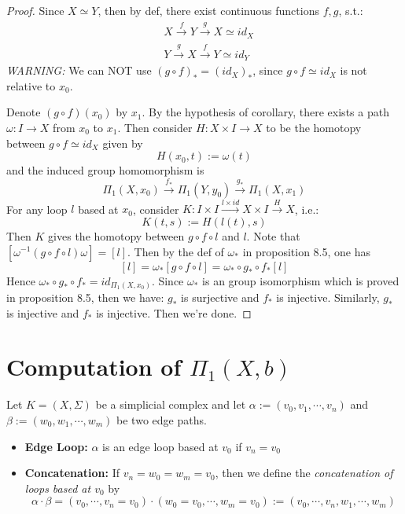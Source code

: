 \begin{proof}
    Since $X \simeq Y$, then by def, there exist continuous functions $f,g$, s.t.:
    \begin{align*}
        &X \overset{f}{\rightarrow} Y \overset{g}{\rightarrow} X \simeq id_X\\
        &Y \overset{g}{\rightarrow} X \overset{f}{\rightarrow} Y \simeq id_Y
    \end{align*}
    \noindent\textit{WARNING:} We can NOT use $(g \circ f)_* = (id_X)_*$, since $g \circ f \simeq id_X$ is not relative to $x_0$.

    Denote $(g \circ f)(x_0)$ by $x_1$. By the hypothesis of corollary, there exists a path $\omega: I \rightarrow X$ from $x_0$ to $x_1$. Then consider $H: X \times I \rightarrow X$ to be the homotopy between $g \circ f \simeq id_X$ given by
    $$H(x_0 ,t) := \omega(t)$$
    and the induced group homomorphism is 
    $$\Pi_1 (X,x_0) \overset{f_*}{\rightarrow} \Pi_1 (Y, y_0) \overset{g_*}{\rightarrow} \Pi_1 (X,x_1)$$
    For any loop $l$ based at $x_0$, consider $K: I\times I \overset{l \times id}{\rightarrow} X \times I \overset{H}{\rightarrow} X$, i.e.:
    $$K (t,s) := H(l(t),s)$$
    Then $K$ gives the homotopy between $g \circ f \circ l$ and $l$. Note that $[\omega^{-1} (g \circ f \circ l)\omega] = [l]$. Then by the def of $\omega_*$ in proposition 8.5, one has
    $$[l] = \omega_* [g \circ f \circ l] = \omega_* \circ g_* \circ f_* [l]$$
    Hence $\omega_* \circ g_* \circ f_* = id_{\Pi_1(X,x_0)}$. Since $\omega_*$ is an group isomorphism which is proved in proposition 8.5, then we have: $g_*$ is surjective and $f_*$ is injective. Similarly, $g_*$ is injective and $f_*$ is injective. Then we're done.
\end{proof}

\section{Computation of $\Pi_1 (X,b)$}

\begin{definition}
    Let $K = (X,\Sigma)$ be a simplicial complex and let $\alpha := (v_0,v_1, \cdots, v_n)$ and $\beta:= (w_0 ,w_1,\cdots, w_m)$ be two edge paths.
    \begin{itemize}
        \item \textbf{Edge Loop:} $\alpha$ is an edge loop based at $v_0$ if $v_n = v_0$
        \item \textbf{Concatenation:} If $v_n= w_0 =w_m =v_0$, then we define the \textit{concatenation of loops based at $v_0$} by
        $$\alpha \cdot \beta = (v_0,\cdots, v_n=v_0) \cdot (w_0 = v_0 ,\cdots, w_m=v_0) := (v_0 , \cdots, v_n,w_1, \cdots ,w_m)$$
    \end{itemize}
\end{definition}

